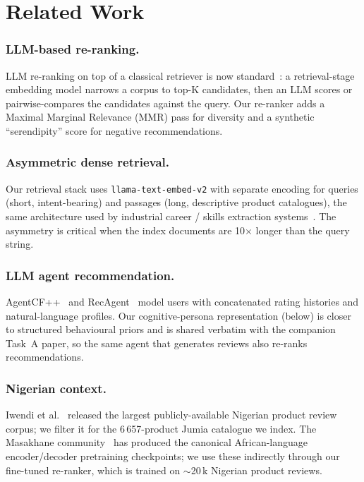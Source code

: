 \documentclass[sigconf,nonacm,balance]{acmart}
\begin{document}
\section{Related Work}

\subsubsection*{LLM-based re-ranking.} LLM re-ranking on top of a classical
retriever is now standard~\cite{recagent}: a retrieval-stage embedding model
narrows a corpus to top-K candidates, then an LLM scores or pairwise-compares
the candidates against the query. Our re-ranker adds a Maximal Marginal
Relevance (MMR) pass for diversity and a synthetic
``serendipity'' score for negative recommendations.

\subsubsection*{Asymmetric dense retrieval.} Our retrieval stack uses
\texttt{llama-text-embed-v2} with separate encoding for queries
(short, intent-bearing) and passages (long, descriptive product
catalogues), the same architecture used by industrial career / skills
extraction systems~\cite{esco-skills}. The asymmetry is critical when
the index documents are 10$\times$ longer than the query string.

\subsubsection*{LLM agent recommendation.} AgentCF++~\cite{agentcf} and
RecAgent~\cite{recagent} model users with concatenated rating histories
and natural-language profiles. Our cognitive-persona representation
(below) is closer to structured behavioural priors and is shared
verbatim with the companion Task~A paper, so the same agent that
generates reviews also re-ranks recommendations.

\subsubsection*{Nigerian context.} Iwendi et al.~\cite{iwendi}
released the largest publicly-available Nigerian product review
corpus; we filter it for the 6\,657-product Jumia catalogue we index.
The Masakhane community~\cite{masakhane} has produced the canonical
African-language encoder/decoder pretraining checkpoints; we use these
indirectly through our fine-tuned re-ranker, which is trained on
$\sim$20\,k Nigerian product reviews.
\end{document}
